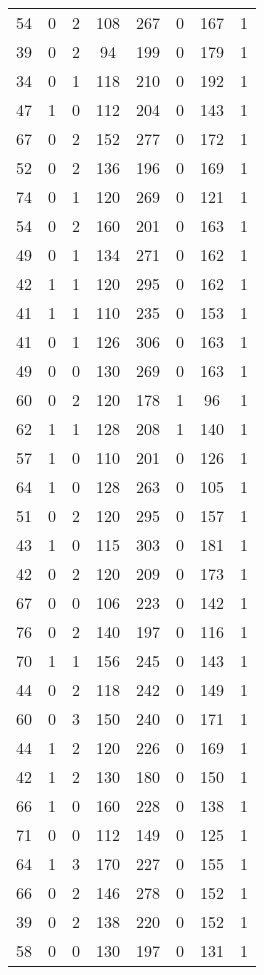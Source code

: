 \documentclass{article}
\begin{document}
\begin{longtable}{*{8}{c}}
54 & 0 & 2 & 108 & 267 & 0 & 167 & 1 \\
39 & 0 & 2 & 94 & 199 & 0 & 179 & 1 \\
34 & 0 & 1 & 118 & 210 & 0 & 192 & 1 \\
47 & 1 & 0 & 112 & 204 & 0 & 143 & 1 \\
67 & 0 & 2 & 152 & 277 & 0 & 172 & 1 \\
52 & 0 & 2 & 136 & 196 & 0 & 169 & 1 \\
74 & 0 & 1 & 120 & 269 & 0 & 121 & 1 \\
54 & 0 & 2 & 160 & 201 & 0 & 163 & 1 \\
49 & 0 & 1 & 134 & 271 & 0 & 162 & 1 \\
42 & 1 & 1 & 120 & 295 & 0 & 162 & 1 \\
41 & 1 & 1 & 110 & 235 & 0 & 153 & 1 \\
41 & 0 & 1 & 126 & 306 & 0 & 163 & 1 \\
49 & 0 & 0 & 130 & 269 & 0 & 163 & 1 \\
60 & 0 & 2 & 120 & 178 & 1 & 96 & 1 \\
62 & 1 & 1 & 128 & 208 & 1 & 140 & 1 \\
57 & 1 & 0 & 110 & 201 & 0 & 126 & 1 \\
64 & 1 & 0 & 128 & 263 & 0 & 105 & 1 \\
51 & 0 & 2 & 120 & 295 & 0 & 157 & 1 \\
43 & 1 & 0 & 115 & 303 & 0 & 181 & 1 \\
42 & 0 & 2 & 120 & 209 & 0 & 173 & 1 \\
67 & 0 & 0 & 106 & 223 & 0 & 142 & 1 \\
76 & 0 & 2 & 140 & 197 & 0 & 116 & 1 \\
70 & 1 & 1 & 156 & 245 & 0 & 143 & 1 \\
44 & 0 & 2 & 118 & 242 & 0 & 149 & 1 \\
60 & 0 & 3 & 150 & 240 & 0 & 171 & 1 \\
44 & 1 & 2 & 120 & 226 & 0 & 169 & 1 \\
42 & 1 & 2 & 130 & 180 & 0 & 150 & 1 \\
66 & 1 & 0 & 160 & 228 & 0 & 138 & 1 \\
71 & 0 & 0 & 112 & 149 & 0 & 125 & 1 \\
64 & 1 & 3 & 170 & 227 & 0 & 155 & 1 \\
66 & 0 & 2 & 146 & 278 & 0 & 152 & 1 \\
39 & 0 & 2 & 138 & 220 & 0 & 152 & 1 \\
58 & 0 & 0 & 130 & 197 & 0 & 131 & 1 \\

\end{longtable}
\end{document}
